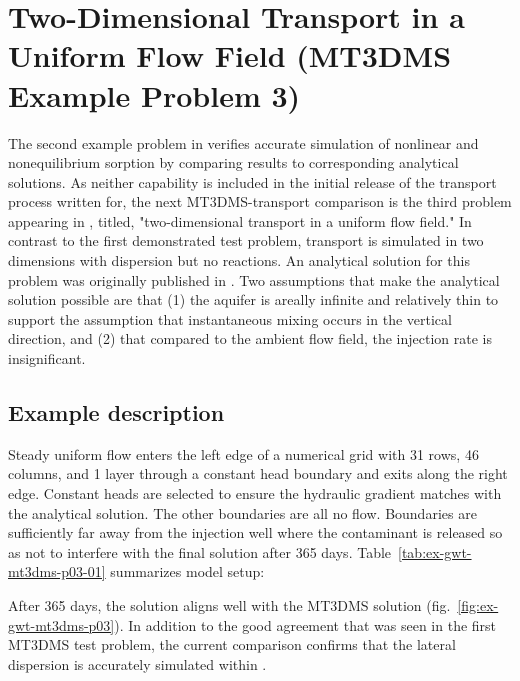 \section{Two-Dimensional Transport in a Uniform Flow Field (MT3DMS Example Problem 3)}

The second example problem in \cite{zheng1999mt3dms} verifies accurate simulation of nonlinear and nonequilibrium sorption by comparing results to corresponding analytical solutions. As neither capability is included in the initial release of the transport process written for\mf, the next MT3DMS-\mf transport comparison is the third problem appearing in \cite{zheng1999mt3dms}, titled, "two-dimensional transport in a uniform flow field." In contrast to the first demonstrated test problem, transport is simulated in two dimensions with dispersion but no reactions. An analytical solution for this problem was originally published in \cite{wilson1978}. Two assumptions that make the analytical solution possible are that (1) the aquifer is areally infinite and relatively thin to support the assumption that instantaneous mixing occurs in the vertical direction, and (2) that compared to the ambient flow field, the injection rate is insignificant.  

\subsection{Example description}

Steady uniform flow enters the left edge of a numerical grid with 31 rows, 46 columns, and 1 layer through a constant head boundary and exits along the right edge. Constant heads are selected to ensure the hydraulic gradient matches with the analytical solution. The other boundaries are all no flow. Boundaries are sufficiently far away from the injection well where the contaminant is released so as not to interfere with the final solution after 365 days. Table~\ref{tab:ex-gwt-mt3dms-p03-01} summarizes model setup:



After 365 days, the \mf solution aligns well with the MT3DMS solution (fig.~\ref{fig:ex-gwt-mt3dms-p03}). In addition to the good agreement that was seen in the first  MT3DMS test problem, the current comparison confirms that the lateral dispersion is accurately simulated within \mf.


